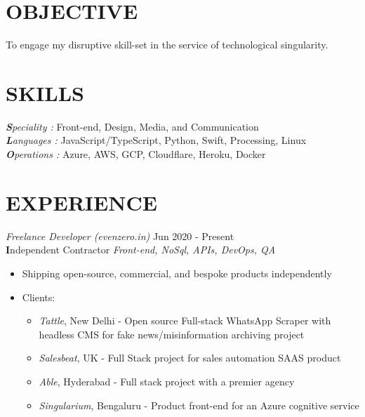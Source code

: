 \documentclass[margin, 10pt]{res} %
\begin{document}
\begin{resume}

\section{\ttfamily OBJECTIVE}  
To engage my disruptive skill-set in the service of technological singularity.

\section{\ttfamily \color{Black} SKILLS} 

{\sl\textbf Speciality :} Front-end, Design, Media, and Communication \\
{\sl\textbf Languages :} JavaScript/TypeScript, Python, Swift, Processing, Linux\\
{\sl\textbf Operations :} Azure, AWS, GCP, Cloudflare, Heroku, Docker


\section{\ttfamily EXPERIENCE}

{\sl Freelance Developer (evenzero.in)} \hfill Jun 2020 - \color{RubineRed} Present\color{Black}\\
\textbf Independent Contractor \hfill {\scriptsize \it Front-end, NoSql, APIs, DevOps, QA}
\begin{itemize}
\item Shipping open-source, commercial, and bespoke products independently
\item Clients:
\begin{itemize}
\item {\sl Tattle}, New Delhi - Open source Full-stack WhatsApp Scraper with headless CMS for fake news/misinformation archiving project
\item {\sl Salesbeat}, UK - Full Stack project for sales automation SAAS product
\item {\sl Able}, Hyderabad - Full stack project with a premier agency
\item {\sl Singularium}, Bengaluru - Product front-end for an Azure cognitive service
\end{itemize}
\end{itemize}


\end{resume}
\end{document}
